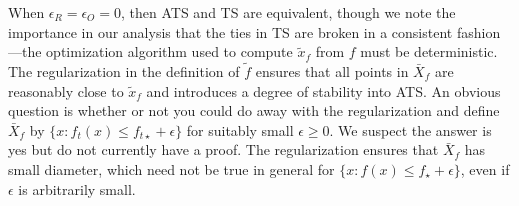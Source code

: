 \documentclass[letter, 12pt]{report}
\newcommand{\epsR}{{\epsilon_R}}
\newcommand{\epsO}{{\epsilon_O}}
\newcommand{\1}{\mathbf{1}}
\newcommand{\ts}{\textsc{TS}\xspace}
\newcommand{\ats}{\textsc{ATS}}
\theoremstyle{plain}
\theoremstyle{definition}
\theoremstyle{remark}
\begin{document}
When $\epsR = \epsO = 0$, then \ats{} and \ts{} are equivalent, though we note the importance in our analysis
that the ties in \ts{} are broken in a consistent fashion---the optimization algorithm used to compute $\tilde x_f$ from $f$ must be deterministic.
The regularization in the definition of $\tilde f$ ensures that all points in $\bar X_f$ are reasonably close to $\tilde x_f$ and introduces
a degree of stability into \ats{}.
An obvious question is whether or not you could do away with the regularization and define $\bar X_f$ by  $\{x : f_t(x) \leq f_{t\star} + \epsilon\}$
for suitably small $\epsilon \geq 0$.
We suspect the answer is yes but do not currently have a proof.
The regularization ensures that $\bar X_f$ has small diameter, which need not be true in general for $\{x : f(x) \leq f_\star + \epsilon\}$,
even if $\epsilon$ is arbitrarily small.
\end{document}
